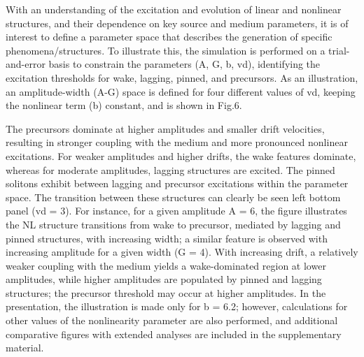 \documentclass[%
 aip,
 amsmath,amssymb,
 reprint,%
]{revtex4-1}
\begin{document}
With an understanding of the excitation and evolution of linear and nonlinear structures, and their dependence on key source and medium parameters, it is of interest to define a parameter space that describes the generation of specific phenomena/structures. To illustrate this, the simulation is performed on a trial-and-error basis to constrain the parameters (A, G, b, vd), identifying the excitation thresholds for wake, lagging, pinned, and precursors. As an illustration, an amplitude-width (A-G) space is defined for four different values of vd, keeping the nonlinear term (b) constant, and is shown in Fig.6. 

The precursors dominate at higher amplitudes and smaller drift velocities, resulting in stronger coupling with the medium and more pronounced nonlinear excitations. For weaker amplitudes and higher drifts, the wake features dominate, whereas for moderate amplitudes, lagging structures are excited. The pinned solitons exhibit between lagging and precursor excitations within the parameter space. The transition between these structures can clearly be seen left bottom panel (vd = 3). For instance, for a given amplitude A = 6, the figure illustrates the NL structure transitions from wake to precursor, mediated by lagging and pinned structures, with increasing width; a similar feature is observed with increasing amplitude for a given width (G = 4). With increasing drift, a relatively weaker coupling with the medium yields a wake-dominated region at lower amplitudes, while higher amplitudes are populated by pinned and lagging structures; the precursor threshold may occur at higher amplitudes. In the presentation, the illustration is made only for b = 6.2; however, calculations for other values of the nonlinearity parameter are also performed, and additional comparative figures with extended analyses are included in the supplementary material.
\end{document}
